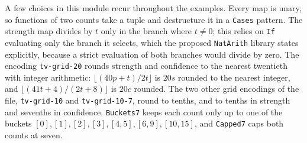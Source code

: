 \documentclass[11pt]{article}
\newcommand{\code}[1]{\texttt{#1}}
\theoremstyle{definition}
\theoremstyle{plain}
\begin{document}
A few choices in this module recur throughout the examples. Every map is unary, so functions of
two counts take a tuple and destructure it in a \code{Cases} pattern. The strength map divides
by $t$ only in the branch where $t\ne0$; this relies on \code{If} evaluating only the branch it
selects, which the proposed \code{NatArith} library states explicitly, because a strict
evaluation of both branches would divide by zero. The encoding \code{tv-grid-20} rounds strength and
confidence to the nearest twentieth with integer arithmetic: $\lfloor(40p+t)/2t\rfloor$ is
$20s$ rounded to the nearest integer, and $\lfloor(41t+4)/(2t+8)\rfloor$ is $20c$ rounded. The two
other grid encodings of the file, \code{tv-grid-10} and \code{tv-grid-10-7}, round to tenths, and
to tenths in strength and sevenths in confidence. \code{Buckets7} keeps each count only up to one
of the buckets $[0],[1],[2],[3],[4,5],[6,9],[10,15]$, and \code{Capped7} caps both counts at seven.
\end{document}
